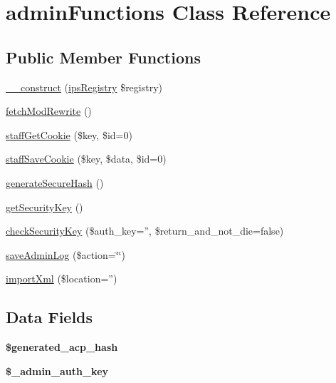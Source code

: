 \hypertarget{classadmin_functions}{\section{admin\-Functions Class Reference}
\label{classadmin_functions}
}
\subsection*{Public Member Functions}
\begin{DoxyCompactItemize}
\item 
\hyperlink{classadmin_functions_a178c3a93e57e75dd87a5d39112af0b07}{\-\_\-\-\_\-construct} (\hyperlink{classips_registry}{ips\-Registry} \$registry)
\item 
\hyperlink{classadmin_functions_a6218bab0c4b7fd19de8c8220aced1aad}{fetch\-Mod\-Rewrite} ()
\item 
\hyperlink{classadmin_functions_ae1759cda7170352c709c2f7bc35a7018}{staff\-Get\-Cookie} (\$key, \$id=0)
\item 
\hyperlink{classadmin_functions_a7e4299ba07179dad57e91d68ede34479}{staff\-Save\-Cookie} (\$key, \$data, \$id=0)
\item 
\hyperlink{classadmin_functions_a39059b317a35e22636a885f3750efa15}{generate\-Secure\-Hash} ()
\item 
\hyperlink{classadmin_functions_a7c8727b196d21c49772e8a9b379b0e6b}{get\-Security\-Key} ()
\item 
\hyperlink{classadmin_functions_a8afd1d389f058d161def7860f3c59184}{check\-Security\-Key} (\$auth\-\_\-key='', \$return\-\_\-and\-\_\-not\-\_\-die=false)
\item 
\hyperlink{classadmin_functions_a61da5c0f970321c640d0d35b10283941}{save\-Admin\-Log} (\$action=\char`\"{}\char`\"{})
\item 
\hyperlink{classadmin_functions_a235c2e270a15609af4bda7136f59a7cd}{import\-Xml} (\$location='')
\end{DoxyCompactItemize}
\subsection*{Data Fields}
\begin{DoxyCompactItemize}
\item 
\hypertarget{classadmin_functions_a5fe0f6158857fdb3c2f290ec8cc09045}{{\bfseries \$generated\-\_\-acp\-\_\-hash}}\label{classadmin_functions_a5fe0f6158857fdb3c2f290ec8cc09045}

\item 
\hypertarget{classadmin_functions_a66d7ddef16312a6e9f6d04b97cef8a30}{{\bfseries \$\-\_\-admin\-\_\-auth\-\_\-key}}\label{classadmin_functions_a66d7ddef16312a6e9f6d04b97cef8a30}

\end{DoxyCompactItemize}
